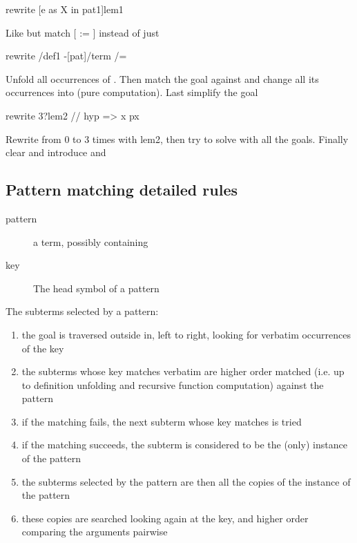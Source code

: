 \begin{landscape}
\begin{small}
\begin{multicols*}{3}[\begin{center}\section*{}\end{center}]
\begin{cheat}
rewrite [e as X in pat1]lem1
\end{cheat}
  Like  but match
  [ := ] instead of just 

\begin{cheat}
rewrite /def1 -[pat]/term /=
\end{cheat}
  Unfold all occurrences of . Then match the goal against 
  and change all its occurrences into  (pure computation). Last
  simplify the goal

\begin{cheat}
rewrite 3?lem2 // {hyp} => x px
\end{cheat}
  Rewrite from 0 to 3 times with lem2, then
  try to solve with  all the goals. Finally clear 
  and introduce  and 

\subsection*{Pattern matching detailed rules}

\begin{description}
\item[pattern] a term, possibly containing \C{_}
\item[key] The head symbol of a pattern
\end{description}

The subterms selected by a pattern:
\begin{enumerate}
\item the goal is traversed outside in, left to right, looking for
      verbatim occurrences of the key
\item the subterms whose key matches verbatim are higher order
      matched (i.e. up to definition unfolding and recursive function
      computation) against the pattern
\item if the matching fails, the next subterm whose key matches is tried
\item if the matching succeeds, the subterm is considered to be the
      (only) instance of the pattern
\item the subterms selected by the pattern are then all the copies of the
      instance of the pattern
\item these copies are searched looking again at the key, and higher order
      comparing the arguments pairwise
\end{enumerate}


\end{multicols*}
\end{small}
\end{landscape}
